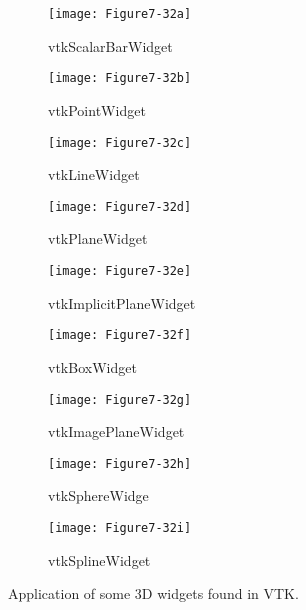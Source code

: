 \begin{figure}[!htb]
	\centering
	\begin{subfigure}{0.32\linewidth}
		\centering
		\texttt{[image: Figure7-32a]}
		\caption*{vtkScalarBarWidget}\label{fig:Figure7-32a}
	\end{subfigure}
	\hfill
	\begin{subfigure}{0.32\linewidth}
		\centering
		\texttt{[image: Figure7-32b]}
		\caption*{vtkPointWidget}\label{fig:Figure7-32b}
	\end{subfigure}%
	\hfill
	\begin{subfigure}{0.32\linewidth}
		\centering
		\texttt{[image: Figure7-32c]}
		\caption*{vtkLineWidget}\label{fig:Figure7-32c}
	\end{subfigure}%
	\hfill
	\begin{subfigure}{0.32\linewidth}
		\centering
		\texttt{[image: Figure7-32d]}
		\caption*{vtkPlaneWidget}\label{fig:Figure7-32d}
	\end{subfigure}
	\hfill
	\begin{subfigure}{0.32\linewidth}
		\centering
		\texttt{[image: Figure7-32e]}
		\caption*{vtkImplicitPlaneWidget}\label{fig:Figure7-32e}
	\end{subfigure}%
	\hfill
	\begin{subfigure}{0.32\linewidth}
		\centering
		\texttt{[image: Figure7-32f]}
		\caption*{vtkBoxWidget}\label{fig:Figure7-32f}
	\end{subfigure}%
	\hfill
	\begin{subfigure}{0.32\linewidth}
		\centering
		\texttt{[image: Figure7-32g]}
		\caption*{vtkImagePlaneWidget}\label{fig:Figure7-32g}
	\end{subfigure}
	\hfill
	\begin{subfigure}{0.32\linewidth}
		\centering
		\texttt{[image: Figure7-32h]}
		\caption*{vtkSphereWidge}\label{fig:Figure7-32h}
	\end{subfigure}%
	\hfill
	\begin{subfigure}{0.32\linewidth}
		\centering
		\texttt{[image: Figure7-32i]}
		\caption*{vtkSplineWidget}\label{fig:Figure7-32i}
	\end{subfigure}%
	\caption{Application of some 3D widgets found in VTK.}
	\label{fig:Figure7-32}
\end{figure}

